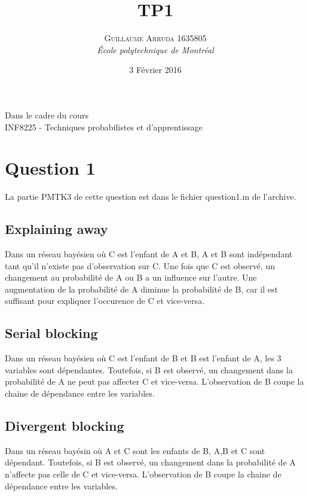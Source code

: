 \documentclass[a4paper, 12pt]{article} %
\title{TP1}
\author{\textsc{Guillaume Arruda 1635805} %
\vspace{10pt}
\\{\textit{École polytechnique de Montréal}}} %
\date{3 Février 2016} %
\makeatletter
\renewcommand{\maketitle}{ %
\begin{center} %

\vspace*{25pt} %
{\LARGE\@title} %

\vspace{125pt} %

{\large\@author} %

\vspace{125pt} %
Dans le cadre du cours
\\INF8225 - Techniques probabilistes et d'apprentissage
\vspace{125pt} %
\\\@date %
\vspace{125pt} %

\end{center}
}
\makeatother
\begin{document}
\thispagestyle{empty}
\clearpage\maketitle %
\pagebreak[4]

\setlength{\headheight}{15.0pt}
\pagestyle{fancy}
\fancyhead[C]{}

\section*{Question 1}
La partie PMTK3 de cette question est dans le fichier question1.m de l'archive.
\subsection*{Explaining away}
Dans un réseau bayésien où C est l'enfant de A et B, A et B sont indépendant tant qu'il n'existe pas d'observation sur C.
Une fois que C est observé, un changement au probabilité de A ou B a un influence sur l'autre. Une augmentation de la probabilité de A
diminue la probabilité de B, car il est suffisant pour expliquer l'occurence de C et vice-versa.
\subsection*{Serial blocking}
Dans un réseau bayésien où C est l'enfant de B et B est l'enfant de A, les 3 variables sont dépendantes. Toutefois, si B est observé,
un changement dans la probabilité de A ne peut pas affecter C et vice-versa. L'observation de B coupe la chaine de dépendance entre les variables.
\subsection*{Divergent blocking}
Dans un réseau bayésin où A et C sont les enfants de B, A,B et C sont dépendant. Toutefois, si B est observé, un changement dans la probabilité de A n'affecte pas celle de C et vice-versa. L'observation de B coupe la chaine de dépendance entre les variables.
\end{document}
